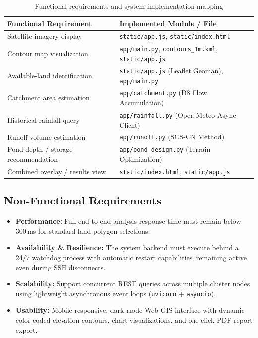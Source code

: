 \documentclass[manuscript,screen,review]{acmart}
\begin{document}
\begin{table}[h]
  \caption{Functional requirements and system implementation mapping}
  \label{tab:requirements}
  \begin{tabular}{p{5.0cm}p{5.0cm}}
    \toprule
    Functional Requirement & Implemented Module / File \\
    \midrule
    Satellite imagery display & \texttt{static/app.js}, \texttt{static/index.html} \\
    Contour map visualization & \texttt{app/main.py}, \texttt{contours\_1m.kml}, \texttt{static/app.js} \\
    Available-land identification & \texttt{static/app.js} (Leaflet Geoman), \texttt{app/main.py} \\
    Catchment area estimation & \texttt{app/catchment.py} (D8 Flow Accumulation) \\
    Historical rainfall query & \texttt{app/rainfall.py} (Open-Meteo Async Client) \\
    Runoff volume estimation & \texttt{app/runoff.py} (SCS-CN Method) \\
    Pond depth / storage recommendation & \texttt{app/pond\_design.py} (Terrain Optimization) \\
    Combined overlay / results view & \texttt{static/index.html}, \texttt{static/app.js} \\
    \bottomrule
  \end{tabular}
\end{table}

\subsection{Non-Functional Requirements}
\begin{itemize}
    \item \textbf{Performance:} Full end-to-end analysis response time must remain below 300\,ms for standard land polygon selections.
    \item \textbf{Availability \& Resilience:} The system backend must execute behind a 24/7 watchdog process with automatic restart capabilities, remaining active even during SSH disconnects.
    \item \textbf{Scalability:} Support concurrent REST queries across multiple cluster nodes using lightweight asynchronous event loops (\texttt{uvicorn} + \texttt{asyncio}).
    \item \textbf{Usability:} Mobile-responsive, dark-mode Web GIS interface with dynamic color-coded elevation contours, chart visualizations, and one-click PDF report export.
\end{itemize}
\end{document}

